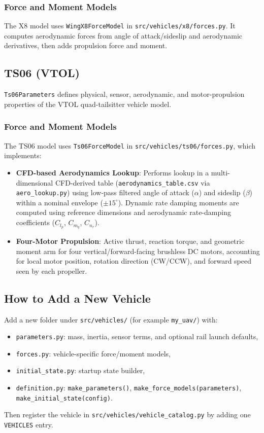 \documentclass[11pt,a4paper]{article}
\begin{document}
\subsubsection*{Force and Moment Models}
The X8 model uses \texttt{WingX8ForceModel} in \texttt{src/vehicles/x8/forces.py}. It computes aerodynamic forces from angle of attack/sideslip and aerodynamic derivatives, then adds propulsion force and moment.

\subsection{TS06 (VTOL)}
\texttt{Ts06Parameters} defines physical, sensor, aerodynamic, and motor-propulsion properties of the VTOL quad-tailsitter vehicle model.

\subsubsection*{Force and Moment Models}
The TS06 model uses \texttt{Ts06ForceModel} in \texttt{src/vehicles/ts06/forces.py}, which implements:
\begin{itemize}
    \item \textbf{CFD-based Aerodynamics Lookup}: Performs lookup in a multi-dimensional CFD-derived table (\texttt{aerodynamics\_table.csv} via \texttt{aero\_lookup.py}) using low-pass filtered angle of attack ($\alpha$) and sideslip ($\beta$) within a nominal envelope ($\pm 15^\circ$). Dynamic rate damping moments are computed using reference dimensions and aerodynamic rate-damping coefficients ($C_{l_p}$, $C_{m_q}$, $C_{n_r}$).
    \item \textbf{Four-Motor Propulsion}: Active thrust, reaction torque, and geometric moment arm for four vertical/forward-facing brushless DC motors, accounting for local motor position, rotation direction (CW/CCW), and forward speed seen by each propeller.
\end{itemize}

\subsection{How to Add a New Vehicle}
Add a new folder under \texttt{src/vehicles/} (for example \texttt{my\_uav/}) with:
\begin{itemize}
    \item \texttt{parameters.py}: mass, inertia, sensor terms, and optional rail launch defaults,
    \item \texttt{forces.py}: vehicle-specific force/moment models,
    \item \texttt{initial\_state.py}: startup state builder,
    \item \texttt{definition.py}: \texttt{make\_parameters()}, \texttt{make\_force\_models(parameters)}, \texttt{make\_initial\_state(config)}.
\end{itemize}
Then register the vehicle in \texttt{src/vehicles/vehicle_catalog.py} by adding one \texttt{VEHICLES} entry.
\end{document}
